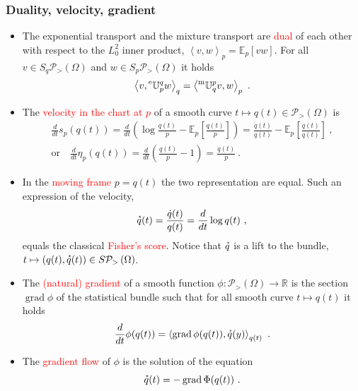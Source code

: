 \documentclass[xcolor=svgnames]{beamer}
\DeclareMathOperator{\Grad}{grad}
\newcommand{\derivby}[1]{\frac{d}{d#1}}
\newcommand{\etransport}[2]{\prescript{\text{e}}{} {\mathbb U} _ {#1} ^ {#2}}
\newcommand{\expbundleat}[1]{S#1}
\newcommand{\expectat}[2]{\mathbb E_{#1}\left[#2\right]}
\newcommand{\expfibreat}[2]{S_{#1}#2}
\newcommand{\mtransport}[2]{\prescript{\text{m}}{} {\mathbb U} _ {#1} ^ {#2}}
\newcommand{\opensimplexon}[1]{\mathcal P_>\left(#1\right)}
\newcommand{\reals}{\mathbb{R}}
\newcommand{\rosso}[1]{\textcolor{red}{#1}}
\newcommand{\scalarat}[3]{\left\langle#2,#3\right\rangle_{#1}}
\newcommand{\velocity}[1]{\accentset{\star}{#1}}
\renewcommand{\emph}{\rosso}
\begin{document}
\begin{frame}\small
  \frametitle{Duality, velocity, gradient}
  \begin{itemize}
  \item The exponential transport and the mixture transport are \emph{dual} of each other with respect to the $L^2_0$ inner product, $\scalarat p v w = \expectat p {v w}$. For all $v \in \expfibreat q {\opensimplexon \Omega}$ and $w \in \expfibreat p {\opensimplexon \Omega}$ it holds
  \begin{equation*}
    \scalarat q v {\etransport p q w} = \scalarat p {\mtransport q p v} w \ . 
  \end{equation*}
\item The \emph{velocity  in the chart at $p$} of a smooth curve $t \mapsto q(t) \in \opensimplexon \Omega$ is
  \begin{gather*}
    \derivby t s_p(q(t)) = \derivby t \left(\log \frac  {q(t)} p  - \expectat p {\frac  {q(t)} p }\right) = \frac{\dot q(t)} {q(t)} - \expectat p {\frac{\dot q(t)} {q(t)}} \ ,\\ \text{or} \quad
    \derivby t \eta_p(q(t)) = \derivby t \left(\frac {q(t)} p -1\right) = \frac {\dot q(t)} p \ .
    \end{gather*}
  \item In the \emph{moving frame} $p = q(t)$ the two representation are equal. Such an expression of the velocity,
    \begin{equation*}
      \velocity q(t) = \frac {\dot q(t)}{q(t)} = \derivby t \log q(t) \ ,  
    \end{equation*}
    equals the classical \emph{Fisher's score}. Notice that $\velocity q$ is a lift to the bundle, $t \mapsto (q(t), \velocity q(t)) \in \expbundleat {\opensimplexon \Omega}$.
  \item The \emph{(natural) gradient} of a smooth function $\phi \colon \opensimplexon \Omega \to \reals$ is the section $\Grad \phi$ of the statistical bundle such that for all smooth curve $t \mapsto q(t)$ it holds
    \begin{equation*}
      \derivby t \phi(q(t)) = \scalarat {q(t)} {\Grad \phi(q(t))} {\velocity q(y)} \ .
    \end{equation*}
    \item The \emph{gradient flow} of $\phi$ is the solution of the equation
      \begin{equation*}
        \velocity q(t) = - \Grad \Phi(q(t)) \ .
      \end{equation*}
  \end{itemize}
\end{frame}
\end{document}
